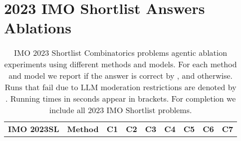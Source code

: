 \section{2023 IMO Shortlist Answers Ablations}
\label{appendix:E}

\label{appendix:D_Combinatorics}
\begin{table}[H]
\caption{IMO 2023 Shortlist Combinatorics problems agentic ablation experiments using different methods and models. For each method and model we report if the answer is correct by \C, and \X otherwise. Runs that fail due to LLM moderation restrictions are denoted by \F.  Running times in seconds appear in brackets. For completion we include all 2023 IMO Shortlist problems.}
  \centering
  \scriptsize
\begin{tabular}{llccccccc}
\toprule
{\bf IMO 2023SL} & {\bf Method} & {\bf C1} & {\bf C2} & {\bf C3} & {\bf C4} & {\bf C5} & {\bf C6} & {\bf C7} \\     


\end{tabular}
\end{table}
